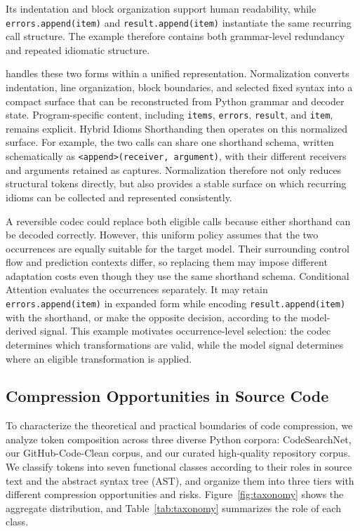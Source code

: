Its indentation and block organization support human readability, while \texttt{errors.append(item)} and \texttt{result.append(item)} instantiate the same recurring call structure. The example therefore contains both grammar-level redundancy and repeated idiomatic structure.

\tool handles these two forms within a unified representation. Normalization converts indentation, line organization, block boundaries, and selected fixed syntax into a compact surface that can be reconstructed from Python grammar and decoder state. Program-specific content, including \texttt{items}, \texttt{errors}, \texttt{result}, and \texttt{item}, remains explicit. Hybrid Idioms Shorthanding then operates on this normalized surface. For example, the two calls can share one shorthand schema, written schematically as \texttt{<append>(receiver, argument)}, with their different receivers and arguments retained as captures. Normalization therefore not only reduces structural tokens directly, but also provides a stable surface on which recurring idioms can be collected and represented consistently.

A reversible codec could replace both eligible calls because either shorthand can be decoded correctly. However, this uniform policy assumes that the two occurrences are equally suitable for the target model. Their surrounding control flow and prediction contexts differ, so replacing them may impose different adaptation costs even though they use the same shorthand schema. Conditional Attention evaluates the occurrences separately. It may retain \texttt{errors.append(item)} in expanded form while encoding \texttt{result.append(item)} with the shorthand, or make the opposite decision, according to the model-derived signal. This example motivates occurrence-level selection: the codec determines which transformations are valid, while the model signal determines where an eligible transformation is applied.


\subsection{Compression Opportunities in Source Code}
\label{subsec:rationale}

To characterize the theoretical and practical boundaries of code compression, we analyze token composition across three diverse Python corpora: CodeSearchNet, our GitHub-Code-Clean corpus, and our curated high-quality repository corpus. We classify tokens into seven functional classes according to their roles in source text and the abstract syntax tree (AST), and organize them into three tiers with different compression opportunities and risks. Figure~\ref{fig:taxonomy} shows the aggregate distribution, and Table~\ref{tab:taxonomy} summarizes the role of each class.

